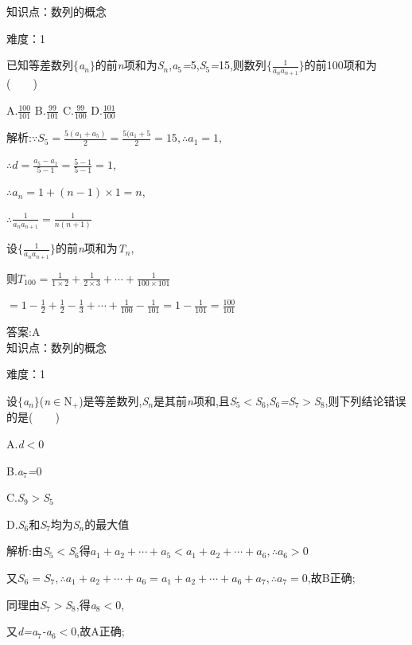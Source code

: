 \documentclass{article} %
\begin{document}
知识点：数列的概念

难度：1

 已知等差数列$\mathrm{\{}$\textit{a${}_{n}$}$\mathrm{\}}$的前\textit{n}项和为\textit{S${}_{n}$},\textit{a}${}_{5}$\textit{=}5,\textit{S}${}_{5}$\textit{=}15,则数列$\{\frac{1}{a_na_{n+1}}\}$的前100项和为(\textit{　　})

 A.$\frac{100}{101}$ B.$\frac{99}{101}$ C.$\frac{99}{100}$ D.$\frac{101}{100}$

 解析:$\because S_5=\frac{5(a_1+a_5)}{2}=\frac{5(a_1+5}{2}=15, \therefore a_1=1$,

$\therefore d=\frac{a_5-a_1}{5-1}=\frac{5-1}{5-1}=1$,

$\therefore a_n=1+(n-1)\times 1=n$,

$\therefore \frac{1}{a_na_{n+1}}=\frac{1}{n(n+1)}$

设$\{\frac{1}{a_na_{n+1}}\}$的前\textit{n}项和为\textit{T${}_{n}$},

则$T_{100}=\frac{1}{1\times 2}+\frac{1}{2\times 3}+\cdots +\frac{1}{100\times 101}$

$=1-\frac{1}{2}+\frac{1}{2}-\frac{1}{3}+\cdots+\frac{1}{100}-\frac{1}{101}=1-\frac{1}{101}=\frac{100}{101}$

 答案:A \\


知识点：数列的概念

难度：1

 设$\mathrm{\{}$\textit{a${}_{n}$}$\mathrm{\}}$(\textit{n}$\mathrm{\in}$N\textit{${}_{+}$})是等差数列,\textit{S${}_{n}$}是其前\textit{n}项和,且\textit{S}${}_{5}$\textit{$<$S}${}_{6}$,\textit{S}${}_{6}$\textit{=S}${}_{7}$\textit{$>$S}${}_{8}$,则下列结论错误的是(\textit{　　})

 A.\textit{d$<$}0 

 B.\textit{a}${}_{7}$\textit{=}0

 C.\textit{S}${}_{9}$\textit{$>$S}${}_{5}$ 

 D.\textit{S}${}_{6}$和\textit{S}${}_{7}$均为\textit{S${}_{n}$}的最大值

 解析:由\textit{S}${}_{5}$\textit{$<$S}${}_{6}$得$a_1+a_2+\cdots+a_5<a_1+a_2+\cdots +a_6,\therefore a_6>0$

又$S_6=S_7,\therefore a_1+a_2+\cdots+a_6=a_1+a_2+\cdots+a_6+a_7,\therefore a_7=0$,故B正确;

同理由\textit{S}${}_{7}$\textit{$>$S}${}_{8}$,得\textit{a}${}_{8}$\textit{$<$}0,

又\textit{d=a}${}_{7}$\textit{-a}${}_{6}$\textit{$<$}0,故A正确;
\end{document}
